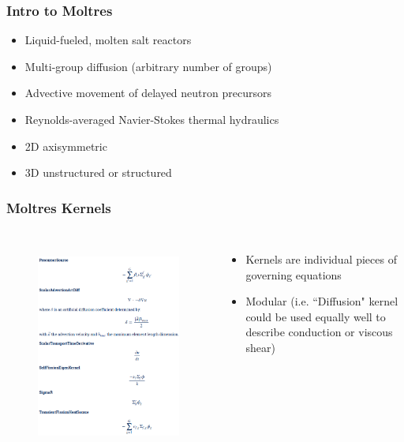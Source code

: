 \begin{frame}
	\frametitle{Intro to Moltres}
    	\begin{itemize}
			\item Liquid-fueled, molten salt reactors
			\item Multi-group diffusion (arbitrary number of groups)
			\item Advective movement of delayed neutron precursors
			\item Reynolds-averaged Navier-Stokes thermal hydraulics
			\item 2D axisymmetric
			\item 3D unstructured or structured
	    \end{itemize}
\end{frame}


\begin{frame}
  \frametitle{Moltres Kernels}
    \begin{columns}
    \column[t]{6cm}
               \begin{figure}[t]
                  \vspace*{-0.15in}
                 \hspace*{-0.35in}
                \includegraphics[height=1.15\textwidth]{./images/kernels4.png}
               \end{figure}   

    \column[t]{6cm}
	\begin{itemize}
		\item Kernels are individual pieces of governing equations
		\item Modular (i.e. ``Diffusion" kernel could be used equally well to describe conduction or viscous shear)
	\end{itemize}
    \end{columns}  
  
\end{frame}

